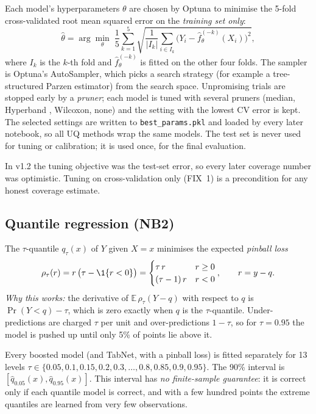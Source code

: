 \documentclass[11pt]{article}
\begin{document}
Each model's hyperparameters $\theta$ are chosen by Optuna \cite{akiba2019optuna} to minimise the 5-fold
cross-validated root mean squared error on the \emph{training set only}:
\begin{equation}
\hat\theta=\arg\min_\theta\;\frac15\sum_{k=1}^5\sqrt{\frac{1}{|I_k|}\sum_{i\in I_k}\big(Y_i-\hat f^{(-k)}_\theta(X_i)\big)^2},
\end{equation}
where $I_k$ is the $k$-th fold and $\hat f^{(-k)}_\theta$ is fitted on the other four folds. The sampler is Optuna's
AutoSampler, which picks a search strategy (for example a tree-structured Parzen estimator) from the search space.
Unpromising trials are stopped early by a \emph{pruner}; each model is tuned with several pruners (median,
Hyperband \cite{li2018hyperband}, Wilcoxon, none) and the setting with the lowest CV error is kept. The selected
settings are written to \texttt{best\_params.pkl} and loaded by every later notebook, so all UQ methods wrap the same
models. The test set is never used for tuning or calibration; it is used once, for the final evaluation.

\begin{insight}
In v1.2 the tuning objective was the test-set error, so every later coverage number was optimistic. Tuning on
cross-validation only (FIX~1) is a precondition for any honest coverage estimate.
\end{insight}

\subsection{Quantile regression (NB2)}
The $\tau$-quantile $q_\tau(x)$ of $Y$ given $X=x$ minimises the expected \emph{pinball loss}
\cite{koenker1978quantile}
\begin{equation}
\rho_\tau(r)=r\,\big(\tau-\1\{r<0\}\big)=\begin{cases}\tau\,r & r\ge0\\(\tau-1)\,r & r<0\end{cases},\qquad r=y-q .
\end{equation}
\emph{Why this works:} the derivative of $\mathbb E\,\rho_\tau(Y-q)$ with respect to $q$ is $\Pr(Y<q)-\tau$, which is
zero exactly when $q$ is the $\tau$-quantile. Under-predictions are charged $\tau$ per unit and over-predictions
$1-\tau$, so for $\tau=0.95$ the model is pushed up until only 5\% of points lie above it.

Every boosted model (and TabNet, with a pinball loss) is fitted separately for 13 levels
$\tau\in\{0.05,0.1,0.15,0.2,0.3,\dots,0.8,0.85,0.9,0.95\}$. The 90\% interval is $[\hat q_{0.05}(x),\hat q_{0.95}(x)]$.
This interval has \emph{no finite-sample guarantee}: it is correct only if each quantile model is correct, and with a
few hundred points the extreme quantiles are learned from very few observations.
\end{document}

